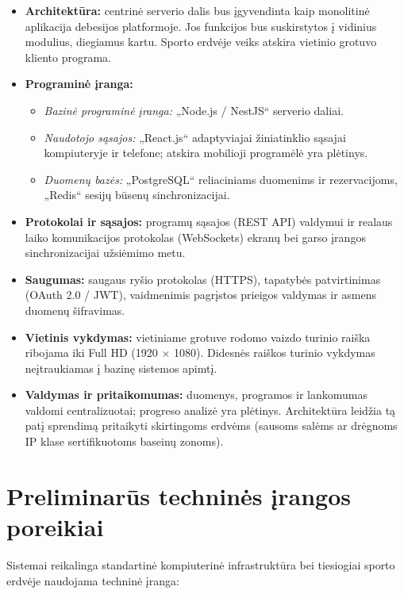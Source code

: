 \documentclass[a4paper,11pt]{article}
\begin{document}
\begin{itemize}
    \item \textbf{Architektūra:} centrinė serverio dalis bus įgyvendinta kaip monolitinė aplikacija debesijos platformoje. Jos funkcijos bus suskirstytos į vidinius modulius, diegiamus kartu. Sporto erdvėje veiks atskira vietinio grotuvo kliento programa.
    \item \textbf{Programinė įranga:} 
    \begin{itemize}
        \item \textit{Bazinė programinė įranga:} „Node.js / NestJS“ serverio daliai.
        \item \textit{Naudotojo sąsajos:} „React.js“ adaptyviajai žiniatinklio sąsajai kompiuteryje ir telefone; atskira mobilioji programėlė yra plėtinys.
        \item \textit{Duomenų bazės:} „PostgreSQL“ reliaciniams duomenims ir rezervacijoms, „Redis“ sesijų būsenų sinchronizacijai.
    \end{itemize}
    \item \textbf{Protokolai ir sąsajos:} programų sąsajos (REST API) valdymui ir realaus laiko komunikacijos protokolas (WebSockets) ekranų bei garso įrangos sinchronizacijai užsiėmimo metu.
    \item \textbf{Saugumas:} saugaus ryšio protokolas (HTTPS), tapatybės patvirtinimas (OAuth 2.0 / JWT), vaidmenimis pagrįstos prieigos valdymas ir asmens duomenų šifravimas.
    \item \textbf{Vietinis vykdymas:} vietiniame grotuve rodomo vaizdo turinio raiška ribojama iki Full HD (1920 $\times$ 1080). Didesnės raiškos turinio vykdymas neįtraukiamas į bazinę sistemos apimtį.
    \item \textbf{Valdymas ir pritaikomumas:} duomenys, programos ir lankomumas valdomi centralizuotai; progreso analizė yra plėtinys. Architektūra leidžia tą patį sprendimą pritaikyti skirtingoms erdvėms (sausoms salėms ar drėgnoms IP klase sertifikuotoms baseinų zonoms).
\end{itemize}

\section{Preliminarūs techninės įrangos poreikiai}

Sistemai reikalinga standartinė kompiuterinė infrastruktūra bei tiesiogiai sporto erdvėje naudojama techninė įranga:
\end{document}
